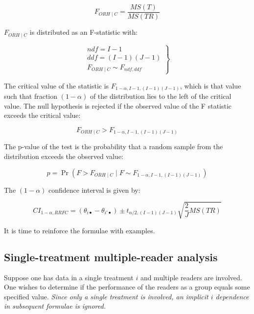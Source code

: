 \documentclass[
]{book}
\begin{document}
\begin{equation}
F_{ORH \mid C}=\frac{MS(T)}{MS(TR)}
\label{eq:DefFStatRRFC}
\end{equation}

\(F_{ORH \mid C}\) is distributed as an F-statistic with:

\begin{equation}
\left.\begin{matrix}
ndf=I-1\\ 
ddf=(I-1)(J-1)\\
F_{ORH \mid C} \sim F_{ndf,ddf}
\end{matrix}\right\}
\label{eq:FStatRRFC}
\end{equation}

The critical value of the statistic is \(F_{1-\alpha,I-1,(I-1)(J-1)}\), which is that value such that fraction \((1-\alpha)\) of the distribution lies to the left of the critical value. The null hypothesis is rejected if the observed value of the F statistic exceeds the critical value:

\[F_{ORH \mid C}>F_{1-\alpha,I-1,(I-1)(J-1)}\]

The p-value of the test is the probability that a random sample from the distribution exceeds the observed value:

\[p=\Pr(F>F_{ORH \mid C} \mid F \sim F_{1-\alpha,I-1,(I-1)(J-1)})\]

The \((1-\alpha)\) confidence interval is given by:

\begin{equation}
CI_{1-\alpha,RRFC}=(\theta_{i \bullet} - \theta_{i' \bullet}) \pm t_{\alpha/2, (I-1)(J-1)}\sqrt{\frac{2}{J}MS(TR)}
\label{eq:CIalphaRRFC}
\end{equation}

It is time to reinforce the formulae with examples.

\hypertarget{single-treatment-multiple-reader-analysis}{%
\subsection{Single-treatment multiple-reader analysis}\label{single-treatment-multiple-reader-analysis}}

Suppose one has data in a single treatment \(i\) and multiple readers are involved. One wishes to determine if the performance of the readers as a group equals some specified value. \emph{Since only a single treatment is involved, an implicit \(i\) dependence in subsequent formulae is ignored.}
\end{document}
